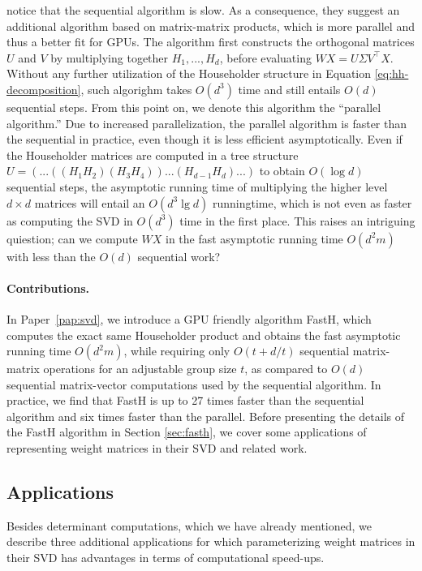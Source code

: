 \documentclass[11pt,a4paper,twoside,openright,final]{memoir}
\newcommand*{\paperref}[1]{Paper~\hyperref[#1]{\ref{#1}}}
\begin{document}
\citet{sequential} notice that the sequential algorithm is slow. 
As a consequence, they suggest an additional algorithm based on matrix-matrix products, which is more parallel and thus a better fit for GPUs. 
The algorithm first constructs the orthogonal matrices $U$ and $V$ by multiplying together $H_1, ..., H_d$, before evaluating $WX = U\Sigma V^\intercal X$.
Without any further utilization of the Householder structure in Equation \eqref{eq:hh-decomposition}, such algorighm takes $O(d^3)$ time and still entails $O(d)$ sequential steps.
From this point on, we denote this algorithm the ``parallel algorithm.''
Due to increased parallelization, the parallel algorithm is faster than the sequential in practice, even though it is less efficient asymptotically.
Even if the Householder matrices are computed in a tree structure $U = (...((H_1H_2)(H_3H_4))...(H_{d-1}H_d)...)$ to obtain $O(\log d)$ sequential steps, the asymptotic running time of multiplying the higher level $d\times d$ matrices will entail an $O(d^3\lg d)$ runningtime, which is not even as faster as computing the SVD in $O(d^3)$ time in the first place.
This raises an intriguing quiestion; can we compute $WX$ in the fast asymptotic running time $O(d^2m)$ with less than the $O(d)$ sequential work?  

\paragraph{Contributions.} In \paperref{pap:svd}, we introduce a GPU friendly algorithm FastH, which computes the exact same Householder product and obtains the fast asymptotic running time $O(d^2m)$, while requiring only $O(t + d/t)$ sequential matrix-matrix operations for an adjustable group size $t$, as compared to $O(d)$ sequential matrix-vector computations used by the sequential algorithm.
In practice, we find that FastH is up to 27 times faster than the sequential algorithm and six times faster than the parallel. 
Before presenting the details of the FastH algorithm in Section \ref{sec:fasth}, we cover some applications of representing weight matrices in their SVD and related work.

\subsection{Applications}\label{sec:fasth-applications}
Besides determinant computations, which we have already mentioned, we describe three additional applications for which parameterizing weight matrices in their SVD has advantages in terms of computational speed-ups.
\end{document}
